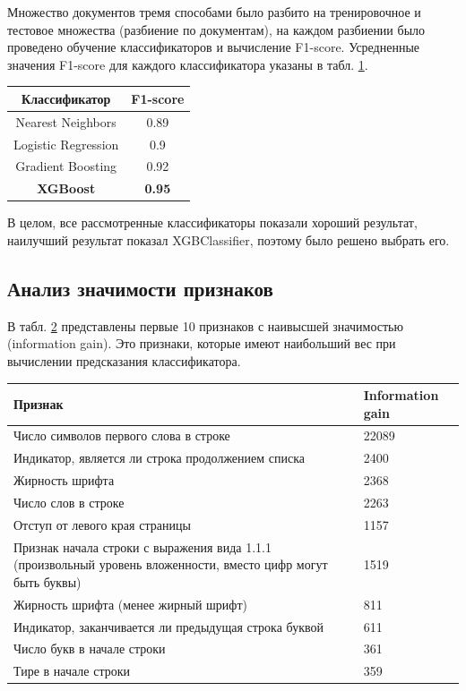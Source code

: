 \documentclass{ProcISPRAS}
\begin{document}
Множество документов тремя способами было разбито на тренировочное и тестовое множества (разбиение по документам), на каждом разбиении было проведено обучение классификаторов и вычисление F1-score. Усредненные значения F1-score для каждого классификатора указаны в табл. \ref{tab:classifier_comparison}.
\begin{table}[t]
\begin{tabular}{cc}
 \toprule
    \textbf{Классификатор} & \textbf{F1-score} \\
    \midrule
        Nearest Neighbors & 0.89 \\
        Logistic Regression & 0.9 \\
        Gradient Boosting & 0.92 \\
        \bf XGBoost & \bf 0.95 \\
    \bottomrule
    \end{tabular}
    \label{tab:classifier_comparison}
\end{table}

В целом, все рассмотренные классификаторы показали хороший результат, наилучший результат показал XGBClassifier, поэтому было решено выбрать его.

\subsection{Анализ значимости признаков}

В табл. \ref{tab:features_importances} представлены первые 10 признаков с наивысшей значимостью (information gain). Это признаки, которые имеют наибольший вес при вычислении предсказания классификатора.

\begin{table}[ht]
    \begin{tabular}{p{}p{}}
    \toprule
    \textbf{Признак} & \textbf{Information gain} \\
    \midrule
        Число символов первого слова в строке & 22089 \\
        Индикатор, является ли строка продолжением списка & 2400 \\
        Жирность шрифта & 2368 \\
        Число слов в строке & 2263 \\
        Отступ от левого края страницы & 1157 \\
        Признак начала строки с выражения вида 1.1.1 (произвольный уровень вложенности, вместо цифр могут быть буквы) & 1519 \\
        Жирность шрифта (менее жирный шрифт) & 811 \\
        Индикатор, заканчивается ли предыдущая строка буквой & 611 \\
        Число букв в начале строки & 361 \\
        Тире в начале строки & 359 \\
    \bottomrule
    \end{tabular}
    \label{tab:features_importances}
\end{table}
\end{document}
